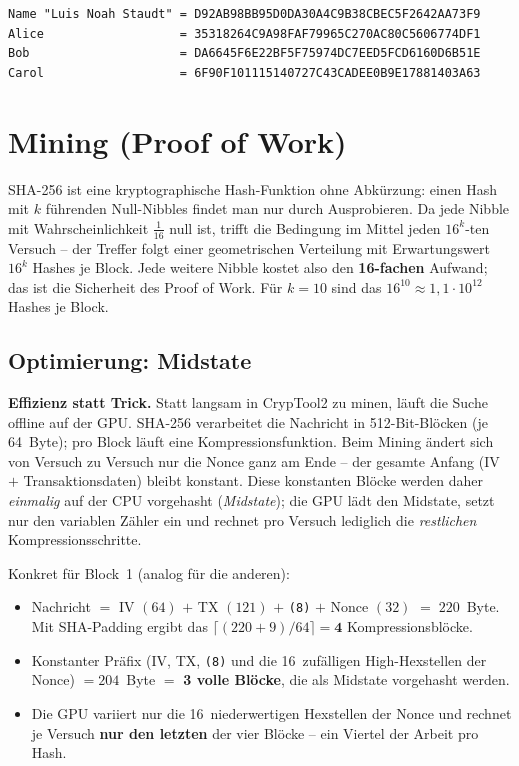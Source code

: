 \documentclass[
    fontsize=12pt,          %
    paper=a4,               %
    numbers=noenddot,       %
    listof=totoc,           %
    listof=entryprefix,     %
    listof=nochaptergap,    %
    bibliography=totoc,     %
    parskip=half,           %
    openany                 %
]{scrbook}
\begin{document}
\begin{lstlisting}[caption={SHA1 von Absender- und Empfängernamen}]
Name "Luis Noah Staudt" = D92AB98BB95D0DA30A4C9B38CBEC5F2642AA73F9
Alice                   = 35318264C9A98FAF79965C270AC80C5606774DF1
Bob                     = DA6645F6E22BF5F75974DC7EED5FCD6160D6B51E
Carol                   = 6F90F101115140727C43CADEE0B9E17881403A63
\end{lstlisting}


\section*{Mining (Proof of Work)}

SHA-256 ist eine kryptographische Hash-Funktion ohne Abkürzung: einen Hash mit $k$ führenden
Null-Nibbles findet man nur durch Ausprobieren. Da jede Nibble mit Wahrscheinlichkeit
$\tfrac{1}{16}$ null ist, trifft die Bedingung im Mittel jeden $16^{k}$-ten Versuch -- der Treffer
folgt einer geometrischen Verteilung mit Erwartungswert $16^{k}$ Hashes je Block.
Jede weitere Nibble kostet also den \textbf{16-fachen} Aufwand; das ist die Sicherheit des Proof
of Work. Für $k=10$ sind das $16^{10}\approx 1{,}1\cdot10^{12}$ Hashes je Block.

\subsection*{Optimierung: Midstate}

\textbf{Effizienz statt Trick.} Statt langsam in CrypTool2 zu minen, läuft die Suche offline auf der
GPU. SHA-256 verarbeitet die Nachricht in 512-Bit-Blöcken (je 64~Byte); pro Block läuft eine
Kompressionsfunktion. Beim Mining ändert sich von Versuch zu Versuch nur die Nonce ganz am Ende --
der gesamte Anfang (IV $+$ Transaktionsdaten) bleibt konstant. Diese konstanten Blöcke werden daher
\emph{einmalig} auf der CPU vorgehasht (\emph{Midstate}); die GPU lädt den Midstate, setzt nur den
variablen Zähler ein und rechnet pro Versuch lediglich die \emph{restlichen} Kompressionsschritte.

Konkret für Block~1 (analog für die anderen):

\begin{itemize}
    \item Nachricht $=$ IV $(64)$ $+$ TX $(121)$ $+$ \texttt{(8)} $+$ Nonce $(32)$ $=\;220$~Byte.
          Mit SHA-Padding ergibt das $\lceil(220+9)/64\rceil = \mathbf{4}$ Kompressionsblöcke.
    \item Konstanter Präfix (IV, TX, \texttt{(8)} und die 16~zufälligen High-Hexstellen der Nonce)
          $=204$~Byte $=$ \textbf{3 volle Blöcke}, die als Midstate vorgehasht werden.
    \item Die GPU variiert nur die 16~niederwertigen Hexstellen der Nonce und rechnet je Versuch
          \textbf{nur den letzten} der vier Blöcke -- ein Viertel der Arbeit pro Hash.
\end{itemize}
\end{document}
